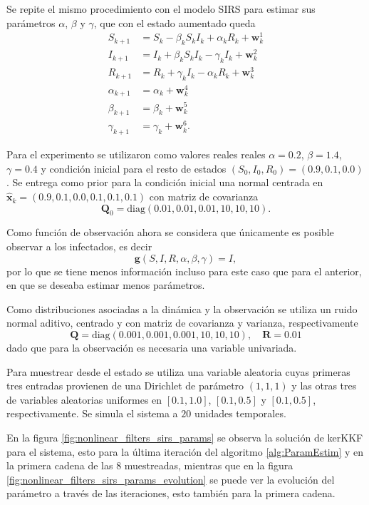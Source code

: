 Se repite el mismo procedimiento con el modelo SIRS para estimar sus parámetros $\alpha$, $\beta$ y $\gamma$, que con el estado aumentado queda
\begin{equation*}
    \begin{aligned}
        S_{k+1} &= S_k - \beta_k S_k I_k + \alpha_k R_k + \mathbf{w}_k^1 \\
        I_{k+1} &= I_k + \beta_k S_k I_k - \gamma_k I_k + \mathbf{w}_k^2 \\
        R_{k+1} &= R_k + \gamma_k I_k - \alpha_k R_k + \mathbf{w}_k^3 \\
        \alpha_{k+1} &= \alpha_k + \mathbf{w}_k^4 \\
        \beta_{k+1} &= \beta_k + \mathbf{w}_k^5 \\
        \gamma_{k+1} &= \gamma_k + \mathbf{w}_k^6.
    \end{aligned}
\end{equation*}

Para el experimento se utilizaron como valores reales reales $\alpha = 0.2$, $\beta = 1.4$, $\gamma = 0.4$ y condición inicial para el resto de estados $(S_0, I_0, R_0) = (0.9, 0.1, 0.0)$. Se entrega como prior para la condición inicial una normal centrada en $\hat{\mathbf{x}}_k = (0.9, 0.1, 0.0, 0.1, 0.1, 0.1)$ con matriz de covarianza
\[
\mathbf{Q}_0 = \text{diag}(0.01, 0.01, 0.01, 10, 10, 10).
\]

Como función de observación ahora se considera que únicamente es posible observar a los infectados, es decir
\[
\mathbf{g}(S, I, R, \alpha, \beta, \gamma) = I,
\]
por lo que se tiene menos información incluso para este caso que para el anterior, en que se deseaba estimar menos parámetros.

Como distribuciones asociadas a la dinámica y la observación se utiliza un ruido normal aditivo, centrado y con matriz de covarianza y varianza, respectivamente
\[
\mathbf{Q} = \text{diag}(0.001, 0.001, 0.001, 10, 10, 10), \quad \mathbf{R} = 0.01
\]
dado que para la observación es necesaria una variable univariada.

Para muestrear desde el estado se utiliza una variable aleatoria cuyas primeras tres entradas provienen de una Dirichlet de parámetro $(1,1,1)$ y las otras tres de variables aleatorias uniformes en $[0.1, 1.0]$, $[0.1, 0.5]$ y $[0.1, 0.5]$, respectivamente. Se simula el sistema a $20$ unidades temporales.

En la figura \ref{fig:nonlinear_filters_sirs_params} se observa la solución de kerKKF para el sistema, esto para la última iteración del algoritmo \ref{alg:ParamEstim} y en la primera cadena de las $8$ muestreadas, mientras que en la figura \ref{fig:nonlinear_filters_sirs_params_evolution} se puede ver la evolución del parámetro a través de las iteraciones, esto también para la primera cadena.

